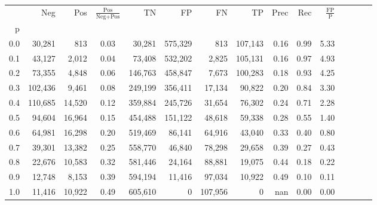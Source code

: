 \begin{tabular}{rrrcrrrrrrrrrrr}
\toprule
{} &      Neg &     Pos & $\frac{\text{Pos}}{\text{Neg}+\text{Pos}}$ &       TN &       FP &       FN &       TP &  Prec &   Rec & $\frac{\text{FP}}{\text{P}}$ \\
p   &          &         &                                            &          &          &          &          &       &       &                              \\
\midrule
0.0 &   30,281 &     813 &                                       0.03 &   30,281 &  575,329 &      813 &  107,143 &  0.16 &  0.99 &                         5.33 \\
0.1 &   43,127 &   2,012 &                                       0.04 &   73,408 &  532,202 &    2,825 &  105,131 &  0.16 &  0.97 &                         4.93 \\
0.2 &   73,355 &   4,848 &                                       0.06 &  146,763 &  458,847 &    7,673 &  100,283 &  0.18 &  0.93 &                         4.25 \\
0.3 &  102,436 &   9,461 &                                       0.08 &  249,199 &  356,411 &   17,134 &   90,822 &  0.20 &  0.84 &                         3.30 \\
0.4 &  110,685 &  14,520 &                                       0.12 &  359,884 &  245,726 &   31,654 &   76,302 &  0.24 &  0.71 &                         2.28 \\
0.5 &   94,604 &  16,964 &                                       0.15 &  454,488 &  151,122 &   48,618 &   59,338 &  0.28 &  0.55 &                         1.40 \\
0.6 &   64,981 &  16,298 &                                       0.20 &  519,469 &   86,141 &   64,916 &   43,040 &  0.33 &  0.40 &                         0.80 \\
0.7 &   39,301 &  13,382 &                                       0.25 &  558,770 &   46,840 &   78,298 &   29,658 &  0.39 &  0.27 &                         0.43 \\
0.8 &   22,676 &  10,583 &                                       0.32 &  581,446 &   24,164 &   88,881 &   19,075 &  0.44 &  0.18 &                         0.22 \\
0.9 &   12,748 &   8,153 &                                       0.39 &  594,194 &   11,416 &   97,034 &   10,922 &  0.49 &  0.10 &                         0.11 \\
1.0 &   11,416 &  10,922 &                                       0.49 &  605,610 &        0 &  107,956 &        0 &   nan &  0.00 &                         0.00 \\
\bottomrule
\end{tabular}
